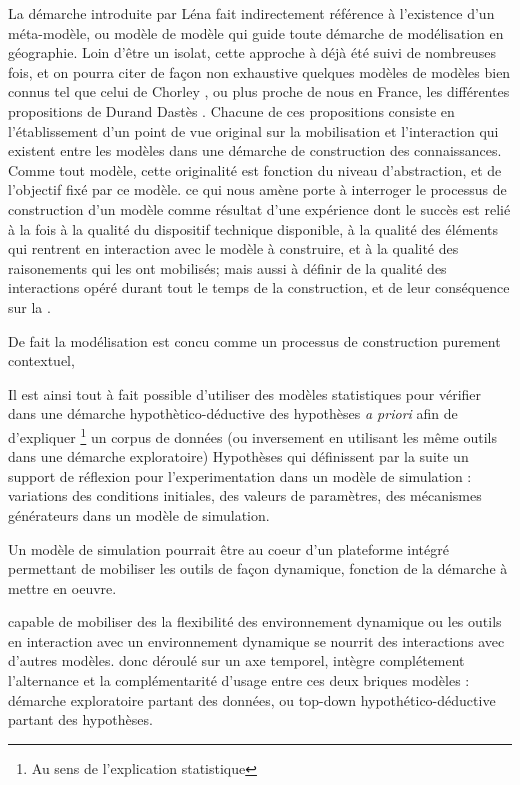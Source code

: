 {%
La démarche introduite par Léna fait indirectement référence à l'existence d'un méta-modèle, ou modèle de modèle qui guide toute démarche de modélisation en géographie. Loin d'être un isolat, cette approche à déjà été suivi de nombreuses fois, et on pourra citer de façon non exhaustive quelques modèles de modèles bien connus tel que celui de Chorley \autocite{Hagget1965}, ou plus proche de nous en France, les différentes propositions de Durand Dastès \autocite{Dastes1992} \autocite{Dastes2001b}. Chacune de ces propositions consiste en l'établissement d'un point de vue original sur la mobilisation et l'interaction qui existent entre les modèles dans une démarche de construction des connaissances. Comme tout modèle, cette originalité est fonction du niveau d'abstraction, et de l'objectif fixé par ce modèle. ce qui nous amène porte à interroger le processus de construction d'un modèle comme résultat d'une expérience dont le succès est relié à la fois à la qualité du dispositif technique disponible, à la qualité des éléments qui rentrent en interaction avec le modèle à construire, et à la qualité des raisonements qui les ont mobilisés; mais aussi à définir de la qualité des interactions opéré durant tout le temps de la construction, et de leur conséquence sur la .

De fait la modélisation est concu comme un processus de construction purement contextuel, 

Il est ainsi tout à fait possible d'utiliser des modèles statistiques pour vérifier dans une démarche hypothètico-déductive des hypothèses \textit{a priori} afin de d'expliquer \footnote{Au sens de l'explication statistique} un corpus de données (ou inversement en utilisant les même outils dans une démarche exploratoire) Hypothèses qui définissent par la suite un support de réflexion pour l'experimentation dans un modèle de simulation : variations des conditions initiales, des valeurs de paramètres, des mécanismes générateurs dans un modèle de simulation. 

Un modèle de simulation pourrait être au coeur d'un plateforme intégré permettant de mobiliser les outils de façon dynamique, fonction de la démarche à mettre en oeuvre.

 capable de mobiliser des la flexibilité des  environnement dynamique ou les outils   en interaction avec un environnement dynamique se nourrit des interactions avec d'autres modèles.  donc déroulé sur un axe temporel, intègre complétement l'alternance et la complémentarité d'usage entre ces deux briques modèles : démarche exploratoire partant des données, ou top-down hypothético-déductive partant des hypothèses. 



}
